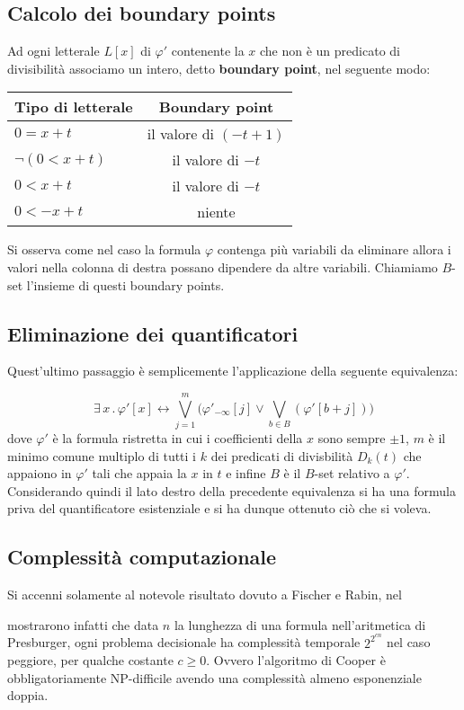 \documentclass[11pt,letterpaper,twoside]{article}
\begin{document}
\subsection{Calcolo dei boundary points}
Ad ogni letterale $L[x]$ di $\varphi '$ contenente la $x$ che non \`e un
predicato di divisibilit\`a associamo un intero, detto \textbf{boundary point},
nel seguente modo:

\begin{center}
  \begin{tabular}{ l | c }
    Tipo di letterale & Boundary point \\ \hline
    $0=x+t$ & il valore di $(-t + 1)$ \\
    $\lnot (0 < x+t)$ & il valore di $-t$ \\
    $0 < x + t$ & il valore di $-t$ \\
    $0 < -x + t$ &  niente
  \end{tabular}
\end{center}
Si osserva come nel caso la formula $\varphi$ contenga pi\`u variabili da eliminare
allora i valori nella colonna di destra possano dipendere da altre variabili.
Chiamiamo $B$-set l'insieme di questi boundary points.

\subsection{Eliminazione dei quantificatori}
Quest'ultimo passaggio \`e semplicemente l'applicazione della seguente
equivalenza\autocite{cooper}:

$$ \exists \, x \, . \, \varphi'[x] \longleftrightarrow \bigvee_{j=1}^m \Big(
\varphi'_{- \infty}[j] \lor \bigvee_{b \in B}(\varphi'[b+j]) \Big)$$
dove $\varphi'$ \`e la formula ristretta in cui i coefficienti della $x$ sono
sempre $\pm 1$, $m$ \`e il minimo comune multiplo di tutti i $k$ dei predicati
di divisbilit\`a $D_k(t)$ che appaiono in $\varphi'$ tali che appaia la $x$ in
$t$ e infine $B$ \`e il $B$-set relativo a $\varphi'$.
Considerando quindi il lato destro della precedente equivalenza si ha una
formula priva del quantificatore esistenziale e si ha dunque ottenuto ci\`o che
si voleva.

\subsection{Complessità computazionale}
Si accenni solamente al notevole risultato dovuto a Fischer e
Rabin\autocite{complexity}, nel \date{1974} mostrarono infatti che data $n$ la
lunghezza di una formula nell'aritmetica di Presburger, ogni problema
decisionale ha complessità temporale $2^{2^{cn}}$ nel caso peggiore, per qualche
costante $c \ge 0$. Ovvero l'algoritmo di Cooper è obbligatoriamente
NP-difficile avendo una complessità almeno esponenziale doppia.
\end{document}
